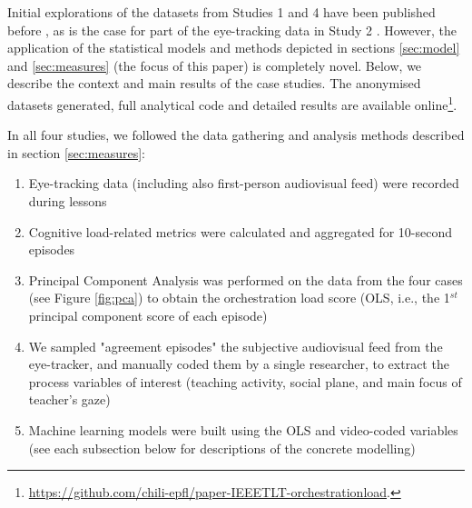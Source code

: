 \documentclass[10pt,journal,compsoc]{IEEEtran}
\begin{document}
Initial explorations of the datasets from Studies 1 and 4 have been published before \cite{Prieto2015cscl}, as is the case for part of the eye-tracking data in Study 2 \cite{Prieto2015ectel}. However, the application of the statistical models and methods depicted in sections \ref{sec:model} and \ref{sec:measures} (the focus of this paper) is completely novel. Below, we describe the context and main results of the case studies. The anonymised datasets generated, full analytical code and detailed results are available online\footnote{\href{https://github.com/chili-epfl/paper-IEEETLT-orchestrationload}{https://github.com/chili-epfl/paper-IEEETLT-orchestrationload}.}.

In all four studies, we followed the data gathering and analysis methods described in section \ref{sec:measures}:

\begin{enumerate}
\item Eye-tracking data (including also first-person audiovisual feed) were recorded during lessons
\item Cognitive load-related metrics were calculated and aggregated for 10-second episodes
\item Principal Component Analysis was performed on the data from the four cases (see Figure \ref{fig:pca}) to obtain the orchestration load score (OLS, i.e., the 1$^{st}$ principal component score of each episode)
\item We sampled "agreement episodes" the subjective audiovisual feed from the eye-tracker, and manually coded them by a single researcher, to extract the process variables of interest (teaching activity, social plane, and main focus of teacher's gaze)
\item Machine learning models were built using the OLS and video-coded variables (see each subsection below for descriptions of the concrete modelling)
\end{enumerate}
\end{document}
